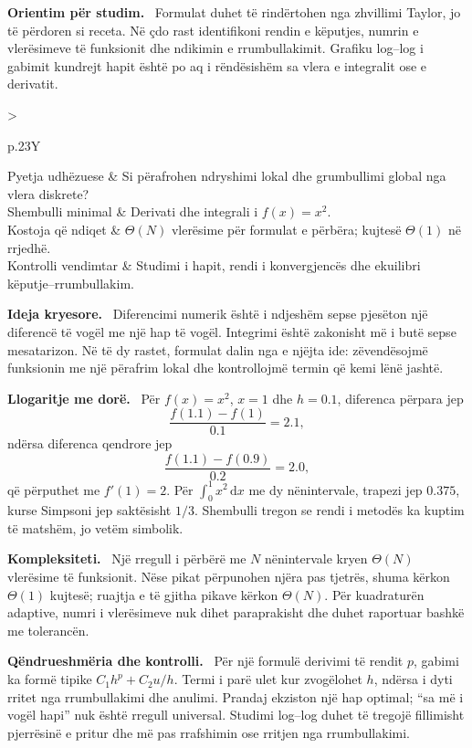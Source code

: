 \documentclass[11pt,oneside,openany]{book}
\newcommand{\dd}{\,\mathrm{d}}
\newenvironment{orientim}{\par\medskip\noindent\textbf{Orientim për studim.}\ }{\par\medskip}
\newenvironment{ideja}{\par\medskip\noindent\textbf{Ideja kryesore.}\ }{\par\medskip}
\newenvironment{llogaritjedore}{\par\medskip\noindent\textbf{Llogaritje me dorë.}\ }{\par\medskip}
\newenvironment{kompleksitet}{\par\medskip\noindent\textbf{Kompleksiteti.}\ }{\par\medskip}
\newenvironment{qendrueshmeri}{\par\medskip\noindent\textbf{Qëndrueshmëria dhe kontrolli.}\ }{\par\medskip}
\newcommand{\hartakapitullit}[4]{%
\par\smallskip
\noindent\begin{tabularx}{\textwidth}{>{\bfseries\raggedright\arraybackslash}p{.23\textwidth}Y}
Pyetja udhëzuese & #1\\
Shembulli minimal & #2\\
Kostoja që ndiqet & #3\\
Kontrolli vendimtar & #4
\end{tabularx}\par\medskip}
\begin{document}
\begin{orientim}
Formulat duhet të rindërtohen nga zhvillimi Taylor, jo të përdoren si receta.
Në çdo rast identifikoni rendin e këputjes, numrin e vlerësimeve të funksionit
dhe ndikimin e rrumbullakimit. Grafiku log--log i gabimit kundrejt hapit është
po aq i rëndësishëm sa vlera e integralit ose e derivatit.
\end{orientim}

\hartakapitullit
{Si përafrohen ndryshimi lokal dhe grumbullimi global nga vlera diskrete?}
{Derivati dhe integrali i $f(x)=x^2$.}
{$\Theta(N)$ vlerësime për formulat e përbëra; kujtesë $\Theta(1)$ në rrjedhë.}
{Studimi i hapit, rendi i konvergjencës dhe ekuilibri këputje--rrumbullakim.}

\begin{ideja}
Diferencimi numerik është i ndjeshëm sepse pjesëton një diferencë të vogël me
një hap të vogël. Integrimi është zakonisht më i butë sepse mesatarizon.
Në të dy rastet, formulat dalin nga e njëjta ide: zëvendësojmë funksionin me
një përafrim lokal dhe kontrollojmë termin që kemi lënë jashtë.
\end{ideja}

\begin{llogaritjedore}
Për $f(x)=x^2$, $x=1$ dhe $h=0.1$, diferenca përpara jep
\begin{equation}
 \frac{f(1.1)-f(1)}{0.1}=2.1,
\end{equation}
ndërsa diferenca qendrore jep
\begin{equation}
 \frac{f(1.1)-f(0.9)}{0.2}=2.0,
\end{equation}
që përputhet me $f'(1)=2$. Për $\int_0^1x^2\dd x$ me dy nënintervale,
trapezi jep $0.375$, kurse Simpsoni jep saktësisht $1/3$. Shembulli tregon
se rendi i metodës ka kuptim të matshëm, jo vetëm simbolik.
\end{llogaritjedore}

\begin{kompleksitet}
Një rregull i përbërë me $N$ nënintervale kryen $\Theta(N)$ vlerësime të
funksionit. Nëse pikat përpunohen njëra pas tjetrës, shuma kërkon
$\Theta(1)$ kujtesë; ruajtja e të gjitha pikave kërkon $\Theta(N)$. Për
kuadraturën adaptive, numri i vlerësimeve nuk dihet paraprakisht dhe duhet
raportuar bashkë me tolerancën.
\end{kompleksitet}

\begin{qendrueshmeri}
Për një formulë derivimi të rendit $p$, gabimi ka formë tipike
$C_1h^p+C_2u/h$. Termi i parë ulet kur zvogëlohet $h$, ndërsa i dyti rritet
nga rrumbullakimi dhe anulimi. Prandaj ekziston një hap optimal; ``sa më i
vogël hapi'' nuk është rregull universal. Studimi log--log duhet të tregojë
fillimisht pjerrësinë e pritur dhe më pas rrafshimin ose rritjen nga
rrumbullakimi.
\end{qendrueshmeri}
\end{document}
